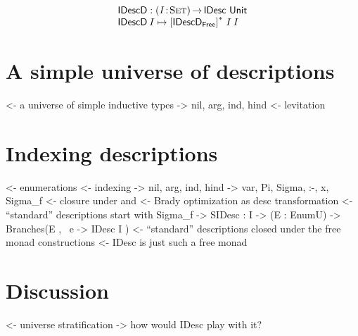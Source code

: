 \documentclass[preprint, authoryear, onecolumn]{sigplanconf}
\newenvironment{structure}{\footnotesize\verbatim}{\endverbatim}
\begin{document}
\[\stk{
\IDescD : \PI{\V{I}}{\Set} \IDesc{\Unit} \\
\IDescD\: I \mapsto \FreeMonad{[\IDescFreeD]}{I}\: I
}\]


\section{A simple universe of descriptions}

\begin{structure}
<- a universe of simple inductive types
    -> nil, arg, ind, hind
<- levitation
\end{structure}


\section{Indexing descriptions}


\begin{structure}
<- enumerations
<- indexing
    -> nil, arg, ind, hind
    -> var, Pi, Sigma, :-, x, Sigma_f
<- closure under \box and \diamond
<- Brady optimization as desc transformation
<- ``standard'' descriptions start with Sigma_f
    -> SIDesc : I -> (E : EnumU) -> Branches(E , \ e -> IDesc I )
<- ``standard'' descriptions closed under the free monad constructions
<- IDesc is just such a free monad
\end{structure}


\section{Discussion}

\begin{structure}
<- universe stratification
    -> how would IDesc play with it?
\end{structure}


\end{document}
